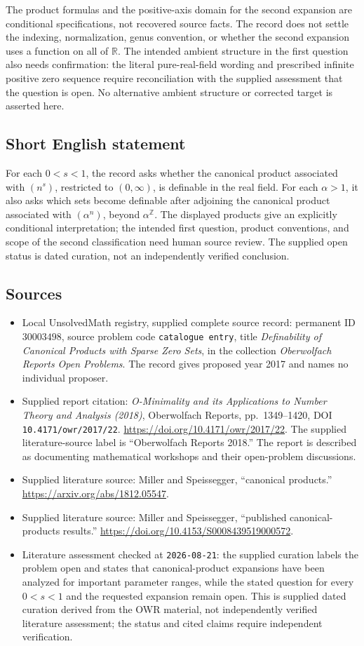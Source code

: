 \documentclass[11pt]{article}
\newcommand{\Z}{\mathbb{Z}}
\newcommand{\R}{\mathbb{R}}
\begin{document}
The product formulas and the positive-axis domain for the second expansion are conditional specifications, not recovered source facts. The record does not settle the indexing, normalization, genus convention, or whether the second expansion uses a function on all of \(\R\). The intended ambient structure in the first question also needs confirmation: the literal pure-real-field wording and prescribed infinite positive zero sequence require reconciliation with the supplied assessment that the question is open. No alternative ambient structure or corrected target is asserted here.
\subsection{Short English statement}
For each \(0<s<1\), the record asks whether the canonical product associated with \((n^s)\), restricted to \((0,\infty)\), is definable in the real field. For each \(\alpha>1\), it also asks which sets become definable after adjoining the canonical product associated with \((\alpha^n)\), beyond \(\alpha^{\Z}\). The displayed products give an explicitly conditional interpretation; the intended first question, product conventions, and scope of the second classification need human source review. The supplied open status is dated curation, not an independently verified conclusion.
\subsection{Sources}
\begin{itemize}
\item Local UnsolvedMath registry, supplied complete source record: permanent ID \(30003498\), source problem code \texttt{catalogue entry}, title \emph{Definability of Canonical Products with Sparse Zero Sets}, in the collection \emph{Oberwolfach Reports Open Problems}. The record gives proposed year 2017 and names no individual proposer.
\item Supplied report citation: \emph{O-Minimality and its Applications to Number Theory and Analysis (2018)}, Oberwolfach Reports, pp.~1349--1420, DOI \texttt{10.4171/owr/2017/22}. \url{https://doi.org/10.4171/owr/2017/22}. The supplied literature-source label is ``Oberwolfach Reports 2018.'' The report is described as documenting mathematical workshops and their open-problem discussions.
\item Supplied literature source: Miller and Speissegger, ``canonical products.'' \url{https://arxiv.org/abs/1812.05547}.
\item Supplied literature source: Miller and Speissegger, ``published canonical-products results.'' \url{https://doi.org/10.4153/S0008439519000572}.
\item Literature assessment checked at \texttt{2026-08-21}: the supplied curation labels the problem open and states that canonical-product expansions have been analyzed for important parameter ranges, while the stated question for every \(0<s<1\) and the requested expansion remain open. This is supplied dated curation derived from the OWR material, not independently verified literature assessment; the status and cited claims require independent verification.
\end{itemize}
\end{document}
